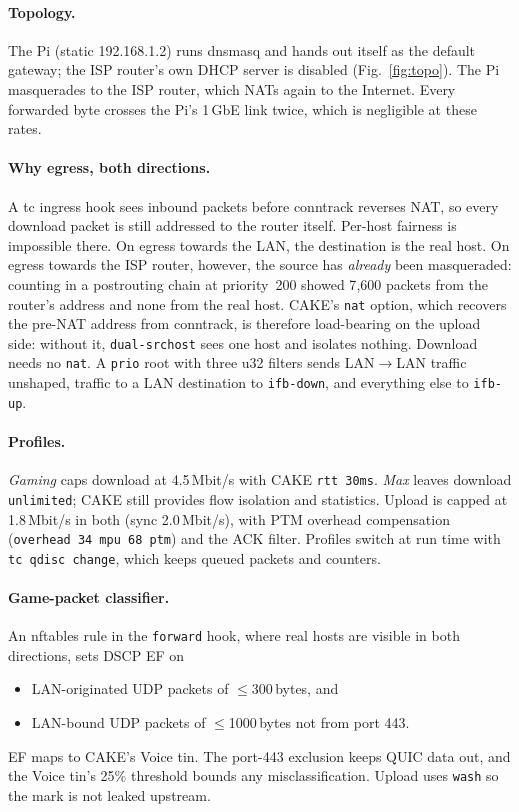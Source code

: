 \documentclass[10pt,twocolumn]{article}
\begin{document}
\paragraph{Topology.} The Pi (static 192.168.1.2) runs dnsmasq and hands out
itself as the default gateway; the ISP router's own DHCP server is disabled
(Fig.~\ref{fig:topo}). The Pi masquerades to the ISP router, which NATs again
to the Internet. Every forwarded byte crosses the Pi's 1\,GbE link twice, which
is negligible at these rates.

\paragraph{Why egress, both directions.} A tc ingress hook sees inbound packets
before conntrack reverses NAT, so every download packet is still addressed to
the router itself. Per-host fairness is impossible there. On egress towards the
LAN, the destination is the real host. On egress towards the ISP router, however, the
source has \emph{already} been masqueraded: counting in a postrouting chain at
priority~200 showed 7{,}600 packets from the router's address and none from the
real host. CAKE's \texttt{nat} option, which recovers the pre-NAT address from
conntrack, is therefore load-bearing on the upload side: without it,
\texttt{dual-srchost} sees one host and isolates nothing. Download needs no
\texttt{nat}. A \texttt{prio} root with three u32 filters sends LAN$\to$LAN traffic
unshaped, traffic to a LAN destination to \texttt{ifb-down}, and everything else to
\texttt{ifb-up}.

\paragraph{Profiles.} \emph{Gaming} caps download at 4.5\,Mbit/s with CAKE
\texttt{rtt 30ms}. \emph{Max} leaves download \texttt{unlimited}; CAKE still
provides flow isolation and statistics. Upload is capped at 1.8\,Mbit/s in both
(sync 2.0\,Mbit/s), with PTM overhead compensation (\texttt{overhead 34 mpu 68
ptm}) and the ACK filter. Profiles switch at run time with
\texttt{tc qdisc change}, which keeps queued packets and counters.

\paragraph{Game-packet classifier.} An nftables rule in the \texttt{forward}
hook, where real hosts are visible in both directions, sets DSCP EF on
\begin{itemize}
\item LAN-originated UDP packets of $\le$300\,bytes, and
\item LAN-bound UDP packets of $\le$1000\,bytes not from port 443.
\end{itemize}
EF maps to CAKE's Voice tin. The port-443 exclusion keeps QUIC data out, and
the Voice tin's 25\% threshold bounds any misclassification. Upload uses
\texttt{wash} so the mark is not leaked upstream.
\end{document}
